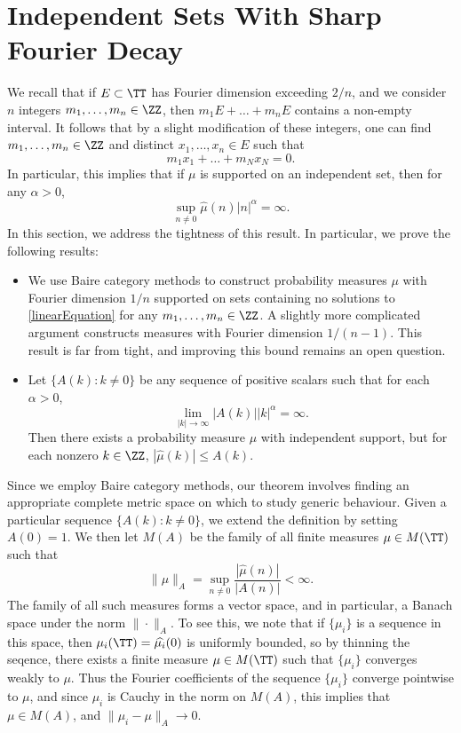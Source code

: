 \section{Independent Sets With Sharp Fourier Decay}

We recall that if $E \subset \TT$ has Fourier dimension exceeding $2/n$, and we consider $n$ integers $m_1, \dots, m_n \in \ZZ$, then $m_1 E + \dots + m_n E$ contains a non-empty interval. It follows that by a slight modification of these integers, one can find $m_1, \dots, m_n \in \ZZ$ and distinct $x_1, \dots, x_n \in E$ such that
%
\begin{equation} \label{linearEquation}
	m_1 x_1 + \dots + m_N x_N = 0.
\end{equation}
%
In particular, this implies that if $\mu$ is supported on an independent set, then for any $\alpha > 0$,
%
\[ \sup_{n \neq 0} \widehat{\mu}(n) |n|^\alpha = \infty. \]
%
In this section, we address the tightness of this result. In particular, we prove the following results:
%
\begin{itemize}
	\item We use Baire category methods to construct probability measures $\mu$ with Fourier dimension $1/n$ supported on sets containing no solutions to \eqref{linearEquation} for any $m_1, \dots, m_n \in \ZZ$. A slightly more complicated argument constructs measures with Fourier dimension $1/(n-1)$. This result is far from tight, and improving this bound remains an open question.

	\item Let $\{ A(k) : k \neq 0 \}$ be any sequence of positive scalars such that for each $\alpha > 0$,
	\[ \lim_{|k| \to \infty} |A(k)| |k|^\alpha = \infty. \]
	Then there exists a probability measure $\mu$ with independent support, but for each nonzero $k \in \ZZ$, $|\widehat{\mu}(k)| \leq A(k)$.
\end{itemize}

Since we employ Baire category methods, our theorem involves finding an appropriate complete metric space on which to study generic behaviour. Given a particular sequence $\{ A(k) : k \neq 0 \}$, we extend the definition by setting $A(0) = 1$. We then let $M(A)$ be the family of all finite measures $\mu \in M(\TT)$ such that
%
\[ \| \mu \|_A = \sup_{n \neq 0} \frac{|\widehat{\mu}(n)|}{|A(n)|} < \infty. \]
%
The family of all such measures forms a vector space, and in particular, a Banach space under the norm $\| \cdot \|_A$. To see this, we note that if $\{ \mu_i \}$ is a sequence in this space, then $\mu_i(\TT) = \widehat{\mu_i}(0)$ is uniformly bounded, so by thinning the seqence, there exists a finite measure $\mu \in M(\TT)$ such that $\{ \mu_i \}$ converges weakly to $\mu$. Thus the Fourier coefficients of the sequence $\{ \mu_i \}$ converge pointwise to $\mu$, and since $\mu_i$ is Cauchy in the norm on $M(A)$, this implies that $\mu \in M(A)$, and $\| \mu_i - \mu \|_A \to 0$.

